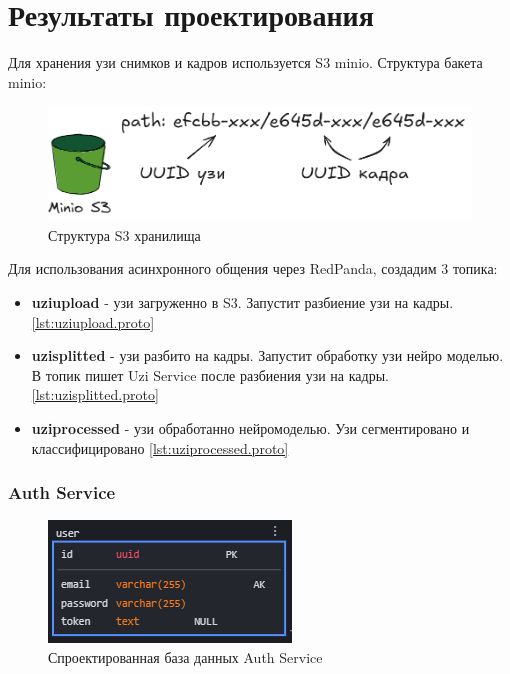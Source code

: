 \chapter{Результаты проектирования}

Для хранения узи снимков и кадров используется S3 minio. Структура бакета minio:
\begin{figure}[H]%
	\begin{center}
		\includegraphics[width=.6\columnwidth]{./img/s3_arc.png}%
	\end{center}
	\caption{Структура S3 хранилища}%
	\label{pic:auth_model}%
\end{figure}

Для использования асинхронного общения через RedPanda, создадим 3 топика:
\begin{itemize}
    \item \textbf{uziupload} - узи загруженно в S3. Запустит разбиение узи на кадры. \ref{lst:uziupload.proto}
    \item \textbf{uzisplitted} - узи разбито на кадры. Запустит обработку узи нейро моделью. В топик пишет Uzi Service после разбиения узи на кадры. \ref{lst:uzisplitted.proto}
    \item \textbf{uziprocessed} - узи обработанно нейромоделью. Узи сегментировано и классифицировано \ref{lst:uziprocessed.proto}
\end{itemize}


\subsection{Auth Service}
\begin{figure}[H]%
	\begin{center}
		\includegraphics[width=.7\columnwidth]{./img/auth_db.png}%
	\end{center}
	\caption{Спроектированная база данных Auth Service}%
	\label{pic:auth_model}%
\end{figure}


